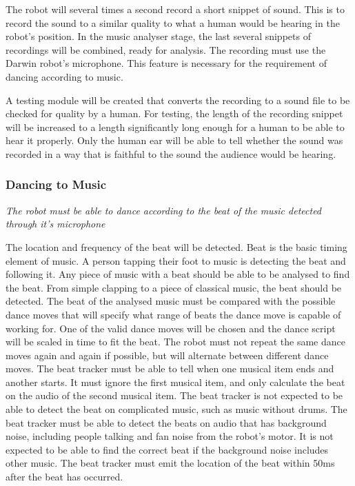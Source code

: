 \documentclass[english,12pt]{scrartcl}
\newcommand{\requirement}[1]{\textit{#1}}
\begin{document}
				The robot will several times a second record a short snippet of sound.
				This is to record the sound to a similar quality to what a human would be hearing in the robot’s position.
				In the music analyser stage, the last several snippets of recordings will be combined, ready for analysis.
				The recording must use the Darwin robot’s microphone. This feature is necessary for the requirement of dancing according to music.

				A testing module will be created that converts the recording to a sound file to be checked for quality by a human.
				For testing, the length of the recording snippet will be increased to a length significantly long enough for a human to be able to hear it properly.
				Only the human ear will be able to tell whether the sound was recorded in a way that is faithful to the sound the audience would be hearing.

			\subsubsection{Dancing to Music}
				\requirement{The robot must be able to dance according to the beat of the music detected through it's microphone}

				The location and frequency of the beat will be detected. Beat is the basic timing element of music.
				A person tapping their foot to music is detecting the beat and following it.
				Any piece of music with a beat should be able to be analysed to find the beat.
				From simple clapping to a piece of classical music, the beat should be detected.
				The beat of the analysed music must be compared with the possible dance moves that will specify what range of beats the dance move is capable of working for.
				One of the valid dance moves will be chosen and the dance script will be scaled in time to fit the beat.
				The robot must not repeat the same dance moves again and again if possible, but will alternate between different dance moves.
				The beat tracker must be able to tell when one musical item ends and another starts. It must ignore the first musical item, and only calculate the beat on the audio of the second musical item.
				The beat tracker is not expected to be able to detect the beat on complicated music, such as music without drums.
				The beat tracker must be able to detect the beats on audio that has background noise, including people talking and fan noise from the robot’s motor.
				It is not expected to be able to find the correct beat if the background noise includes other music. The beat tracker must emit the location of the beat within 50ms after the beat has occurred.
\end{document}
